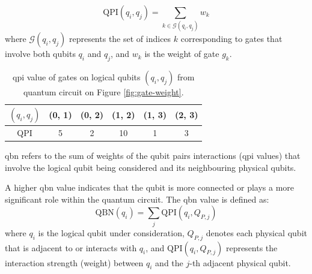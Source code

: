 \begin{equation}
    \text{QPI}(q_i, q_j) = \sum_{k \in \mathcal{G}(q_i, q_j)} w_k
\end{equation}
where $\mathcal{G}(q_i, q_j)$ represents the set of indices $k$ corresponding to gates that involve both qubits $q_i$ and $q_j$, and $w_k$ is the weight of gate $g_k$. \\
\begin{table}[h]
    \centering
    \begin{tabular}{|c|c|c|c|c|c|}
        \hline
        $(q_i, q_j)$ & (0, 1) & (0, 2) & (1, 2) & (1, 3) & (2, 3) \\
        \hline
        QPI & 5 & 2 & 10 & 1 & 3 \\
        \hline
    \end{tabular}
    \caption{\acrshort{qpi} value of gates on logical qubits $(q_i, q_j)$ from quantum circuit on Figure \ref{fig:gate-weight}.}
    \label{tab:qpi-matrix}
\end{table}
\begin{definition}
    \acrfull{qbn} refers to the sum of weights of the qubit pairs interactions (\acrshort{qpi} values) that involve the logical qubit being considered and its neighbouring physical qubits.
\end{definition}
A higher \acrshort{qbn} value indicates that the qubit is more connected or plays a more significant role within the quantum circuit. The \acrshort{qbn} value is defined as:
\begin{equation}
    \text{QBN}(q_i) = \sum_{j} \text{QPI}(q_i, Q_{P,j})
\end{equation}
where $q_i$ is the logical qubit under consideration, $Q_{P,j}$ denotes each physical qubit that is adjacent to or interacts with $q_i$, and $\text{QPI}(q_i, Q_{P,j})$ represents the interaction strength (weight) between $q_i$ and the $j$-th adjacent physical qubit.

